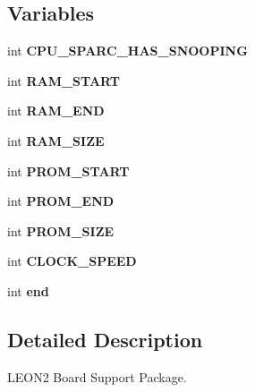 \subsection*{Variables}
\begin{DoxyCompactItemize}
\item 
\mbox{\label{group__RTEMSBSPsSPARCLEON2_ga8ddd79a76dda208a42abbad0f5463b04}} 
int {\bfseries C\+P\+U\+\_\+\+S\+P\+A\+R\+C\+\_\+\+H\+A\+S\+\_\+\+S\+N\+O\+O\+P\+I\+NG}
\item 
\mbox{\label{group__RTEMSBSPsSPARCLEON2_gad56923b97c04785526fa1b6685aeff10}} 
int {\bfseries R\+A\+M\+\_\+\+S\+T\+A\+RT}
\item 
\mbox{\label{group__RTEMSBSPsSPARCLEON2_ga90a78dabec9a7332292f01d55c2658f7}} 
int {\bfseries R\+A\+M\+\_\+\+E\+ND}
\item 
\mbox{\label{group__RTEMSBSPsSPARCLEON2_ga0d7139422464b757b2dd4d21d1e42b73}} 
int {\bfseries R\+A\+M\+\_\+\+S\+I\+ZE}
\item 
\mbox{\label{group__RTEMSBSPsSPARCLEON2_gab54a93149920df372c48cc75a85de3c2}} 
int {\bfseries P\+R\+O\+M\+\_\+\+S\+T\+A\+RT}
\item 
\mbox{\label{group__RTEMSBSPsSPARCLEON2_gafa99fe4b850d0e2d9926b9e88fa271ce}} 
int {\bfseries P\+R\+O\+M\+\_\+\+E\+ND}
\item 
\mbox{\label{group__RTEMSBSPsSPARCLEON2_ga0e8309e99cf221abd59aa515296aded1}} 
int {\bfseries P\+R\+O\+M\+\_\+\+S\+I\+ZE}
\item 
\mbox{\label{group__RTEMSBSPsSPARCLEON2_ga48501d2b46d84f08b7f1312d4b102cb6}} 
int {\bfseries C\+L\+O\+C\+K\+\_\+\+S\+P\+E\+ED}
\item 
\mbox{\label{group__RTEMSBSPsSPARCLEON2_gabce9f5dc9c83f2639b72024fdee5d388}} 
int {\bfseries end}
\end{DoxyCompactItemize}


\subsection{Detailed Description}
L\+E\+O\+N2 Board Support Package. 



